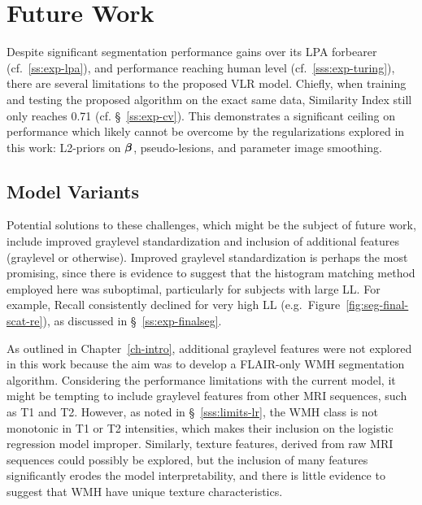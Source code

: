 \section{Future Work}
Despite significant segmentation performance gains over its LPA forbearer (cf.~\ref{ss:exp-lpa}),
and performance reaching human level (cf.~\ref{sss:exp-turing}),
there are several limitations to the proposed VLR model.
Chiefly, when training and testing the proposed algorithm on the exact same data,
Similarity Index still only reaches 0.71 (cf. \S~\ref{ss:exp-cv}).
This demonstrates a significant ceiling on performance
which likely cannot be overcome by the regularizations explored in this work:
L2-priors on $\bm{\beta}$, pseudo-lesions, and parameter image smoothing.
\subsection{Model Variants}
Potential solutions to these challenges, which might be the subject of future work, include
improved graylevel standardization and
inclusion of additional features (graylevel or otherwise).
Improved graylevel standardization is perhaps the most promising,
since there is evidence to suggest that the histogram matching method employed
here was suboptimal, particularly for subjects with large LL.
For example, Recall consistently declined for very high LL
(e.g.\ Figure~\ref{fig:seg-final-scat-re}), as discussed in \S~\ref{ss:exp-finalseg}.
\par
As outlined in Chapter~\ref{ch-intro}, additional graylevel features were not explored in this work
because the aim was to develop a FLAIR-only WMH segmentation algorithm.
Considering the performance limitations with the current model,
it might be tempting to include graylevel features from other MRI sequences, such as T1 and T2.
However, as noted in \S~\ref{sss:limits-lr}, the WMH class is not monotonic in
T1 or T2 intensities, which makes their inclusion on the logistic regression model improper.
Similarly, texture features, derived from raw MRI sequences could possibly be explored,
but the inclusion of many features significantly erodes the model interpretability,
and there is little evidence to suggest that WMH have unique texture characteristics.
